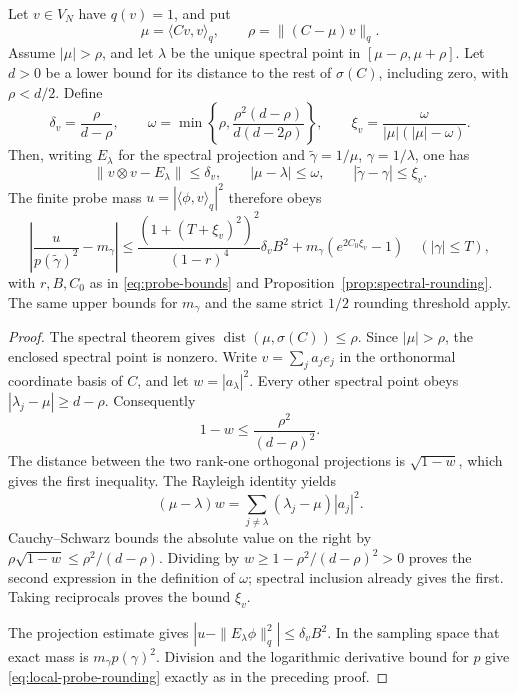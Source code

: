 \begin{proposition}
\label{prop:local-probe-residual}
Let $v\in V_N$ have $q(v)=1$, and put
\[
 \mu=\langle Cv,v\rangle_q,\qquad
 \rho=\|(C-\mu)v\|_q.
\]
Assume $|\mu|>\rho$, and let $\lambda$ be the unique spectral point
in $[\mu-\rho,\mu+\rho]$.  Let $d>0$ be a lower bound for its
distance to the rest of $\sigma(C)$, including zero, with
$\rho<d/2$.  Define
\[
 \delta_v=\frac{\rho}{d-\rho},\qquad
 \omega=\min\left\{\rho,
             \frac{\rho^2(d-\rho)}{d(d-2\rho)}\right\},\qquad
 \xi_v=\frac{\omega}{|\mu|(|\mu|-\omega)}.
\]
Then, writing $E_\lambda$ for the spectral projection and
$\widetilde\gamma=1/\mu$, $\gamma=1/\lambda$, one has
\[
 \|v\otimes v-E_\lambda\|\le\delta_v,
 \qquad |\mu-\lambda|\le\omega,
 \qquad |\widetilde\gamma-\gamma|\le\xi_v.
\]
The finite probe mass $u=|\langle\phi,v\rangle_q|^2$ therefore obeys
\begin{equation}
 \left|\frac{u}{p(\widetilde\gamma)^2}-m_\gamma\right|
 \le\frac{(1+(T+\xi_v)^2)^2}{(1-r)^4}\delta_v B^2
             +m_\gamma(e^{2C_0\xi_v}-1)
 \quad (|\gamma|\le T),
 \label{eq:local-probe-rounding}
\end{equation}
with $r,B,C_0$ as in \eqref{eq:probe-bounds} and
Proposition~\ref{prop:spectral-rounding}.  The same upper bounds for
$m_\gamma$ and the same strict $1/2$ rounding threshold apply.
\end{proposition}

\begin{proof}
The spectral theorem gives
$\operatorname{dist}(\mu,\sigma(C))\le\rho$.  Since $|\mu|>\rho$,
the enclosed spectral point is nonzero.  Write
$v=\sum_j a_je_j$ in the orthonormal coordinate basis of $C$, and
let $w=|a_\lambda|^2$.  Every other spectral point obeys
$|\lambda_j-\mu|\ge d-\rho$.  Consequently
\[
 1-w\le\frac{\rho^2}{(d-\rho)^2}.
\]
The distance between the two rank-one orthogonal projections is
$\sqrt{1-w}$, which gives the first inequality.  The Rayleigh
identity yields
\[
 (\mu-\lambda)w
      =\sum_{j\ne\lambda}(\lambda_j-\mu)|a_j|^2.
\]
Cauchy--Schwarz bounds the absolute value on the right by
$\rho\sqrt{1-w}\le\rho^2/(d-\rho)$.  Dividing by
$w\ge1-\rho^2/(d-\rho)^2>0$ proves the second expression in the
definition of $\omega$; spectral inclusion already gives the first.
Taking reciprocals proves the bound $\xi_v$.

The projection estimate gives
$|u-\|E_\lambda\phi\|_q^2|\le\delta_v B^2$.
In the sampling space that exact mass is $m_\gamma p(\gamma)^2$.
Division and the logarithmic derivative bound for $p$ give
\eqref{eq:local-probe-rounding} exactly as in the preceding proof.
\end{proof}

